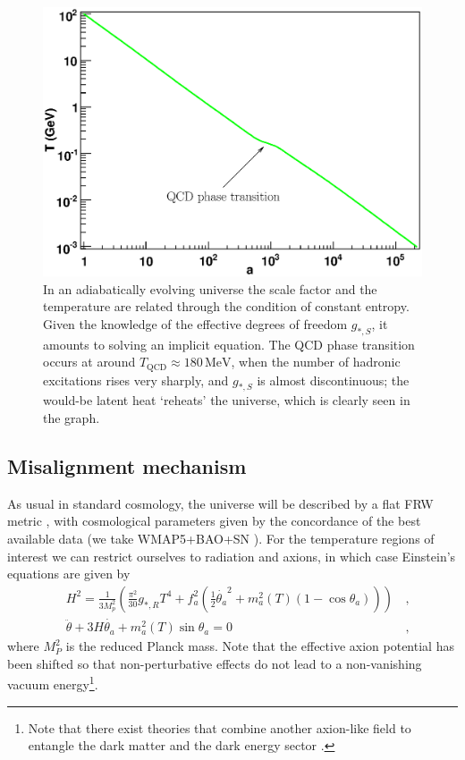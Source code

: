 \documentclass[preprint,nofootinbib]{revtex4}
\newcommand{\units}[1]{\, \mathrm{#1}}
\begin{document}
\begin{figure}[tbp]
\begin{center}
 \includegraphics[width=\figwidth,clip=true,trim=0mm 0mm 15mm 10mm]{aT.eps}
\end{center}
\caption{In an adiabatically evolving universe the scale factor and the temperature are related through the condition of constant entropy. Given the knowledge of the effective degrees of freedom $g_{*,S}$, it amounts to solving an implicit equation. The QCD phase transition occurs at around $T_\mathrm{QCD}\approx 180 \units{MeV}$, when the number of hadronic excitations rises very sharply, and $g_{*,S}$ is almost discontinuous; the would-be latent heat `reheats' the universe, which is clearly seen in the graph.}\label{fig:aT}
\end{figure}

\subsection{Misalignment mechanism}

As usual in standard cosmology, the universe will be described by a flat FRW metric \cite{turner:kolb:cosmology}, with cosmological parameters given by the concordance of the best available data (we take WMAP5+BAO+SN \cite{komatsu:wmap5:cosmological:interpretation}). For the temperature regions of interest we can restrict ourselves to radiation and axions, in which case Einstein's equations are given by
\begin{eqnarray}
&H^2 = \frac{1}{3M_p^2}\left(\frac{\pi^2}{30}g_{*,R}T^4+f_a^2 \left(\frac{1}{2}\dot{\theta_a}^2+m_a^2(T)(1-\cos\theta_a)\right)\right)& \,,\\
&\ddot{\theta} + 3 H \dot{\theta_a} + m_a^2(T) \sin \theta_a = 0 \label{eq:axion:evolution}& \,,
\end{eqnarray}
where $M_P^2$ is the reduced Planck mass. Note that the effective axion potential has been shifted so that non-perturbative effects do not lead to a non-vanishing vacuum energy\footnote{Note that there exist theories that combine another axion-like field to entangle the dark matter and the dark energy sector \cite{nilles:quintaxion,kim:axion:quintessential}.}.
\end{document}
